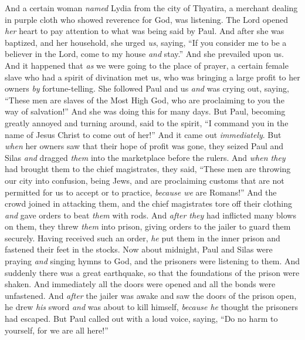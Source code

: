 \begin{biblechapter}
\verse And a certain woman \textit{named} Lydia from the city of Thyatira, a merchant dealing in purple cloth who showed reverence for God, was listening. The Lord opened \textit{her} heart to pay attention to what was being said by Paul.
\verse And after she was baptized, and her household, she urged \textit{us}, saying, “If you consider me to be a believer in the Lord, come to my house \textit{and} stay.” And she prevailed upon us.
 And it happened that \textit{as} we were going to the place of prayer, a certain female slave who had a spirit of divination met us, who was bringing a large profit to her owners \textit{by} fortune-telling.
\verse She followed Paul and us \textit{and} was crying out, saying, “These men are slaves of the Most High God, who are proclaiming to you the way of salvation!”
\verse And she was doing this for many days. But Paul, becoming greatly annoyed and turning around, said to the spirit, “I command you in the name of Jesus Christ to come out of her!” And it came out \textit{immediately}.
\verse But \textit{when} her owners saw that their hope of profit was gone, they seized Paul and Silas \textit{and} dragged \textit{them} into the marketplace before the rulers.
\verse And \textit{when they} had brought them to the chief magistrates, they said, “These men are throwing our city into confusion, being Jews,
\verse and are proclaiming customs that are not permitted for us to accept or to practice, \textit{because we} are Romans!”
\verse And the crowd joined in attacking them, and the chief magistrates tore off their clothing \textit{and} gave orders to beat \textit{them} with rods.
\verse And \textit{after they} had inflicted many blows on them, they threw \textit{them} into prison, giving orders to the jailer to guard them securely.
\verse Having received such an order, \textit{he} put them in the inner prison and fastened their feet in the stocks.
 Now about midnight, Paul and Silas were praying \textit{and} singing hymns to God, and the prisoners were listening to them.
\verse And suddenly there was a great earthquake, so that the foundations of the prison were shaken. And immediately all the doors were opened and all the bonds were unfastened.
\verse And \textit{after} the jailer was awake and saw the doors of the prison open, he drew \textit{his} sword \textit{and} was about to kill himself, \textit{because he} thought the prisoners had escaped.
\verse But Paul called out with a loud voice, saying, “Do no harm to yourself, for we are all here!”

\end{biblechapter}
